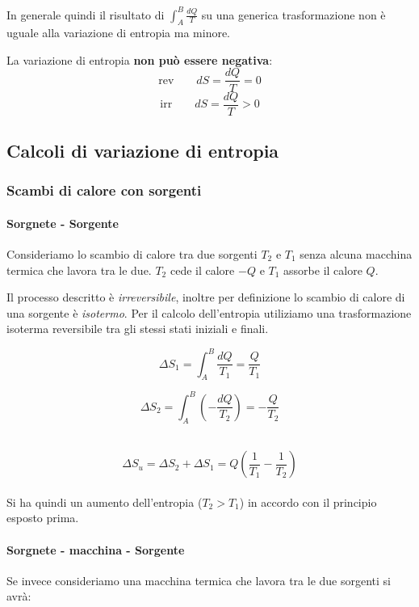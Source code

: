 \documentclass[x11names]{report}
\begin{document}
	In generale quindi il risultato di \(\int_{A}^{B}\frac{dQ}{T}\) su una generica trasformazione non è uguale alla variazione di entropia ma minore.
	
	La variazione di entropia \textbf{non può essere negativa}:
	\[ 
	\text{rev} \qquad dS = \frac{dQ}{T} = 0
	\]
	\[ 
	\text{irr} \qquad dS = \frac{dQ}{T} > 0
	\]
	\subsection{Calcoli di variazione di entropia}
	\subsubsection{Scambi di calore con sorgenti}
	\paragraph{Sorgnete - Sorgente}
	Consideriamo lo scambio di calore tra due sorgenti \(T_{2}\) e \(T_{1}\) senza alcuna macchina termica che lavora tra le due. \(T_{2}\) cede il calore \(-Q\) e \(T_{1}\) assorbe il calore \(Q\). 
	
	
	Il processo descritto è \textit{irreversibile}, inoltre per definizione lo scambio di calore di una sorgente è \textit{isotermo}. Per il calcolo dell'entropia utiliziamo una trasformazione isoterma reversibile tra gli stessi stati iniziali e finali.\\
	
	\begin{minipage}{0.49\textwidth}
		\[ 
		\Delta S_{1} = \int_{A}^{B}\frac{dQ}{T_{1}} = \frac{Q}{T_{1}}
		\]
	\end{minipage}
	\begin{minipage}{0.49\textwidth}
		\[ 
		\Delta S_{2} = \int_{A}^{B}\left(-\frac{dQ}{T_{2}}\right) = -\frac{Q}{T_{2}}
		\]
	\end{minipage}  \\
	
	\[ 
	\Delta S_{u} = \Delta S_{2} + \Delta S_{1}  = Q\left(\frac{1}{T_{1}} - \frac{1}{T_{2}}\right)
	\] \\
	Si ha quindi un aumento dell'entropia (\(T_{2} > T_{1}\)) in accordo con il principio esposto prima.
	
	
	\noindent
	\paragraph{Sorgnete - macchina - Sorgente}Se invece consideriamo una macchina termica che lavora tra le due sorgenti si avrà: \\
	
\end{document}
